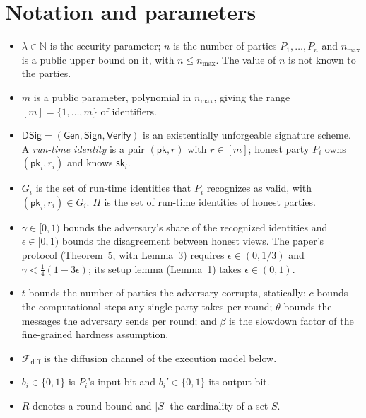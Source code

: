 \documentclass{aicr-conjecture}
\newcommand{\pk}{\mathsf{pk}}
\newcommand{\sk}{\mathsf{sk}}
\newcommand{\DSig}{\mathsf{DSig}}
\newcommand{\Gen}{\mathsf{Gen}}
\newcommand{\Sig}{\mathsf{Sign}}
\newcommand{\Ver}{\mathsf{Verify}}
\newcommand{\Fdiff}{\mathcal{F}_{\mathsf{diff}}}
\begin{document}
\section{Notation and parameters}\label{sec:notation}

\begin{itemize}
\item $\lambda \in \mathbb{N}$ is the security parameter; $n$ is the
  number of parties $P_1,\dots,P_n$ and $n_{\max}$ is a public upper
  bound on it, with $n \le n_{\max}$. The value of $n$ is not known to
  the parties.
\item $m$ is a public parameter, polynomial in $n_{\max}$, giving the
  range $[m] = \{1,\dots,m\}$ of identifiers.
\item $\DSig = (\Gen,\Sig,\Ver)$ is an existentially unforgeable
  signature scheme. A \emph{run-time identity} is a pair $(\pk, r)$ with
  $r \in [m]$; honest party $P_i$ owns $(\pk_i, r_i)$ and knows
  $\sk_i$.
\item $G_i$ is the set of run-time identities that $P_i$ recognizes as
  valid, with $(\pk_i, r_i) \in G_i$. $H$ is the set of run-time
  identities of honest parties.
\item $\gamma \in [0,1)$ bounds the adversary's share of the recognized
  identities and $\epsilon \in [0,1)$ bounds the disagreement between
  honest views. The paper's protocol (Theorem~5, with Lemma~3) requires
  $\epsilon \in (0,1/3)$ and $\gamma < \frac{1}{4}(1-3\epsilon)$; its
  setup lemma (Lemma~1) takes $\epsilon \in (0,1)$.
\item $t$ bounds the number of parties the adversary corrupts,
  statically; $c$ bounds the computational steps any single party takes
  per round; $\theta$ bounds the messages the adversary sends per round;
  and $\beta$ is the slowdown factor of the fine-grained hardness
  assumption.
\item $\Fdiff$ is the diffusion channel of the execution model below.
\item $b_i \in \{0,1\}$ is $P_i$'s input bit and $b_i' \in \{0,1\}$ its
  output bit.
\item $R$ denotes a round bound and $|S|$ the cardinality of a set $S$.
\end{itemize}
\end{document}
